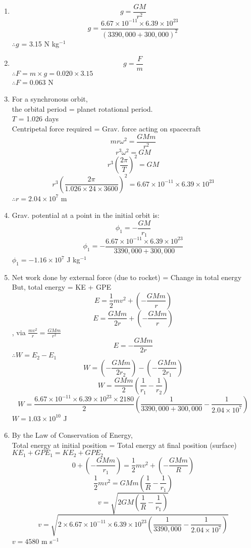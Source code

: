 \documentclass[a4paper,12pt]{article}
\begin{document}
\begin{enumerate}
\begin{enumerate}
\item 
\[g=\frac{GM}{r^2}   \]
\[g=\frac{6.67 \times 10^{-11} \times 6.39 \times 10^{23}}{(3390,000+300,000)^2}   \]
$\therefore g$ = 3.15 N kg$^{-1}$

\item 
\[ g = \frac{F}{m}   \]
$\therefore F = m \times g = 0.020 \times 3.15$\\
$\therefore F = 0.063 $ N\\

\item For a synchronous orbit,\\ the orbital period = planet rotational period.\\
$T$ = 1.026 days\\
Centripetal force required = Grav. force acting on spacecraft \\
\[ mr \omega^2 =\frac{GMm}{r^2}    \]
\[r^3 \omega^2 = GM  \]
\[r^3 \left( \frac{2\pi}{T} \right)^2 = GM    \]
\[r^3 \left( \frac{2\pi}{1.026\times 24 \times 3600} \right)^2 = 6.67 \times 10^{-11} \times 6.39 \times 10^{23} \]
$\therefore r = 2.04 \times 10^7$ m\\

\item Grav. potential at a point in the initial orbit is:\\
\[\phi_1 = -\frac{GM}{r_1}  \]
\[\phi_1 = -\frac{6.67 \times 10^{-11} \times 6.39 \times 10^{23}}{3390,000+300,000} \]
$\phi_1 = -1.16 \times 10^7$ J kg$^{-1}$\\

\item Net work done by external force (due to rocket) = Change in total energy\\
But, total energy = KE + GPE\\
\[E=\frac{1}{2} mv^2 + \left( -\frac{GMm}{r} \right)   \]
\[E=\frac{GMm}{2r} + \left( -\frac{GMm}{r} \right)   \]
, via $\frac{mv^2}{r}=\frac{GMm}{r^2} $
\[E=-\frac{GMm}{2r} \] 
$\therefore W = E_2 - E_1$\\
\[W= \left( -\frac{GMm}{2r_2} \right) - \left( -\frac{GMm}{2r_1} \right)   \] 
\[W= \frac{GMm}{2} \left( \frac{1}{r_1} - \frac{1}{r_2} \right) \] 
\[W= \frac{6.67 \times 10^{-11} \times 6.39 \times 10^{23} \times 2180}{2} \left( \frac{1}{3390,000+300,000} - \frac{1}{2.04 \times 10^7} \right) \] 
$W = 1.03 \times 10^{10}$ J \\

\item By the Law of Conservation of Energy,\\
Total energy at initial position = Total energy at final position (surface)\\
$KE_1 + GPE_1 = KE_2 + GPE_2 $\\
\[0 + \left( -\frac{GMm}{r_1} \right) = \frac{1}{2}mv^2 + \left( -\frac{GMm}{R} \right)   \]
\[\frac{1}{2}mv^2 = GMm \left( \frac{1}{R}  -\frac{1}{r_1} \right) \]
\[v = \sqrt{2GM \left( \frac{1}{R}  -\frac{1}{r_1} \right) } \]
\[v = \sqrt{2 \times 6.67 \times 10^{-11} \times 6.39 \times 10^{23} \left( \frac{1}{3390,000}  -\frac{1}{2.04 \times 10^7} \right) } \]
$v = 4580$ m s$^{-1}$ \\


\end{enumerate}
\end{enumerate}
\end{document}
